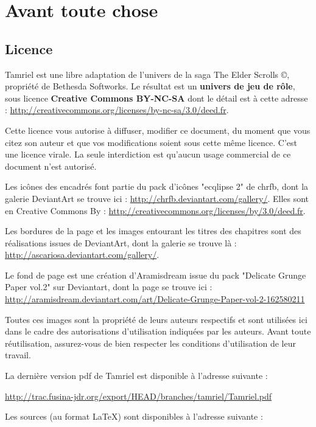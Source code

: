 \part*{Avant toute chose}

\chapter*{Licence}

Tamriel est une libre adaptation de l'univers de la saga The Elder Scrolls ©, propriété de Bethesda Softworks. Le résultat est un \textbf{univers de jeu de rôle}, sous licence \textbf{Creative Commons BY-NC-SA} dont le détail est à cette adresse : \url{http://creativecommons.org/licenses/by-nc-sa/3.0/deed.fr}.

Cette licence vous autorise à diffuser, modifier ce document, du moment que vous citez son auteur et que vos modifications soient sous cette même licence. C'est une licence virale. La seule interdiction est qu'aucun usage commercial de ce document n'est autorisé.

Les icônes des encadrés font partie du pack d'icônes "ecqlipse 2" de chrfb, dont la galerie DeviantArt se trouve ici : \url{http://chrfb.deviantart.com/gallery/}. Elles sont en Creative Commons By : \url{http://creativecommons.org/licenses/by/3.0/deed.fr}.

Les bordures de la page et les images entourant les titres des chapitres sont des réalisations issues de DeviantArt, dont la galerie se trouve là : \url{http://ascariosa.deviantart.com/gallery/}.

Le fond de page est une création d'Aramisdream issue du pack "Delicate Grunge Paper vol.2" sur Deviantart, dont la page se trouve ici : \url{http://aramisdream.deviantart.com/art/Delicate-Grunge-Paper-vol-2-162580211}

Toutes ces images sont la propriété de leurs auteurs respectifs et sont utilisées ici dans le cadre des autorisations d'utilisation indiquées par les auteurs. Avant toute réutilisation, assurez-vous de bien respecter les conditions d'utilisation de leur travail.

La dernière version pdf de Tamriel est disponible à l'adresse suivante :

\begin{center}
  \url{http://trac.fusina-jdr.org/export/HEAD/branches/tamriel/Tamriel.pdf}
\end{center}

Les sources (au format \LaTeX) sont disponibles à l'adresse suivante :

